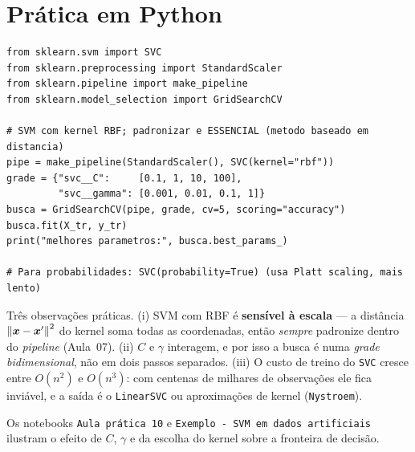 \documentclass[11pt,a4paper]{article}
\begin{document}
\section{Prática em Python}
\begin{lstlisting}
from sklearn.svm import SVC
from sklearn.preprocessing import StandardScaler
from sklearn.pipeline import make_pipeline
from sklearn.model_selection import GridSearchCV

# SVM com kernel RBF; padronizar e ESSENCIAL (metodo baseado em distancia)
pipe = make_pipeline(StandardScaler(), SVC(kernel="rbf"))
grade = {"svc__C":     [0.1, 1, 10, 100],
         "svc__gamma": [0.001, 0.01, 0.1, 1]}
busca = GridSearchCV(pipe, grade, cv=5, scoring="accuracy")
busca.fit(X_tr, y_tr)
print("melhores parametros:", busca.best_params_)

# Para probabilidades: SVC(probability=True) (usa Platt scaling, mais lento)
\end{lstlisting}

\begin{atencao}
Três observações práticas. (i) SVM com RBF é \textbf{sensível à escala} --- a
distância $\left\lVert \bm{x}-\bm{x}' \right\rVert^2$ do kernel soma todas as coordenadas, então
\emph{sempre} padronize dentro do \emph{pipeline} (Aula~07). (ii) $C$ e $\gamma$
interagem, e por isso a busca é numa \emph{grade bidimensional}, não em dois passos
separados. (iii) O custo de treino do \texttt{SVC} cresce entre $O(n^2)$ e
$O(n^3)$: com centenas de milhares de observações ele fica inviável, e a saída é o
\texttt{LinearSVC} ou aproximações de kernel (\texttt{Nystroem}).
\end{atencao}

Os notebooks \texttt{Aula prática 10} e \texttt{Exemplo - SVM em dados artificiais}
ilustram o efeito de $C$,
$\gamma$ e da escolha do kernel sobre a fronteira de decisão.

\end{document}
